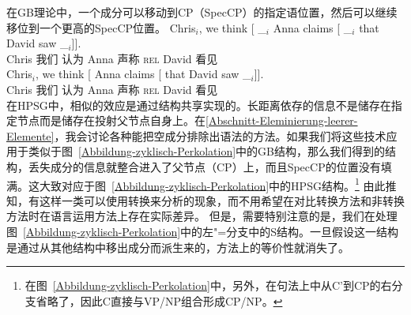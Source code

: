在GB理论中，一个成分可以移动到CP（SpecCP）的指定语位置，然后可以继续移位到一个更高的SpecCP位置。
\eal\settowidth{}
\ex
\gll Chris$_i$, we think [ \_$_i$ Anna claims [ \_$_i$ that David saw \_$_i$]].\\
    Chris 我们 认为 {} {} Anna 声称 {} {} \textsc{rel} David 看见\\
\ex
\gll Chris$_i$, we think [ Anna claims [ that David saw \_$_i$]].\\
    Chris 我们 认为 {} Anna 声称 {} \textsc{rel} David 看见\\
\zl
在HPSG中，相似的效应是通过结构共享实现的。长距离依存的信息不是储存在指定节点而是储存在投射父节点自身上。在\ref{Abschnitt-Eleminierung-leerer-Elemente}，我会讨论各种能把空成分排除出语法的方法。如果我们将这些技术应用于类似于图~\ref{Abbildung-zyklisch-Perkolation}中的GB结构，那么我们得到的结构，丢失成分的信息就整合进入了父节点（CP）上，而且SpecCP的位置没有填满。这大致对应于图~\ref{Abbildung-zyklisch-Perkolation}中的HPSG结构。\footnote{%
在图~\ref{Abbildung-zyklisch-Perkolation}中，另外，在句法上中从C’到CP的右分支省略了，因此C直接与VP/NP组合形成CP/NP。%
}
由此推知，有这样一类可以使用转换来分析的现象，而不用希望在对比转换方法和非转换方法时在语言运用方法上存在实际差异。
但是，需要特别注意的是，我们在处理图~\ref{Abbildung-zyklisch-Perkolation}中的左"=分支中的S结构。一旦假设这一结构是通过从其他结构中移出成分而派生来的，方法上的等价性就消失了。

